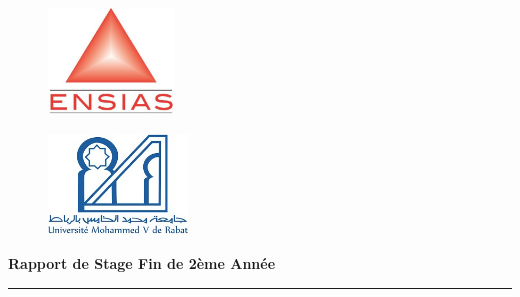 \documentclass[a4paper]{report}
\begin{document}
\begin{titlepage}
    \begin{center}
        \begin{figure}[!h]
            \vspace{- 2 cm}
            \hspace{ 0 cm}
            \includegraphics[width=9em]{images/ensias.jpeg}
        \end{figure}
        \begin{figure}[!h]
            \vspace{- 3.34cm}
            \hspace{14 cm}
            \includegraphics[width=10em]{images/um5.jpeg}
        \end{figure}
    \end{center}

    \begin{center}
        \noindent \hspace{ 0.3 cm }\Huge \textbf{Rapport de Stage Fin de 2ème Année}
        \vspace*{0.1cm}

        \vspace*{0.1cm}
        \begin{center}
            \rule{0.9\linewidth}{1pt}
        \end{center}
        \begin{center}
            \noindent {}\\
        \end{center}



\end{center}
\end{titlepage}
\end{document}
